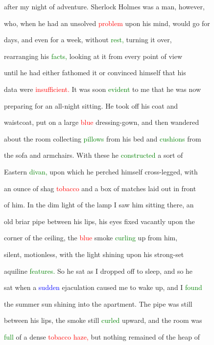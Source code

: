  after my night of \textcolor{BurntOrange}{adventure.} Sherlock Holmes was a man, however,

 who, when he had an unsolved \textcolor{red}{problem} upon his mind, would go for

 days, and even for a week, without \textcolor{green}{rest,} turning it over,

 rearranging his \textcolor{green}{facts,} looking at it from every point of view

 until he had either fathomed it or \textcolor{BurntOrange}{convinced} himself that his

 data were \textcolor{red}{insufficient.} It was soon \textcolor{green}{evident} to me that he was now

 \textcolor{BurntOrange}{preparing} for an all-night sitting. He took off his coat and

 waistcoat, put on a large \textcolor{red}{blue} dressing-gown, and then wandered

 about the room collecting \textcolor{green}{pillows} from his bed and \textcolor{green}{cushions} from

 the sofa and armchairs. With these he \textcolor{green}{constructed} a sort of

 Eastern \textcolor{green}{divan,} upon which he perched himself cross-legged, with

 an ounce of shag \textcolor{red}{tobacco} and a box of matches laid out in front

 of him. In the dim light of the lamp I saw him sitting there, an

 old briar pipe between his lips, his eyes fixed vacantly upon the

 corner of the ceiling, the \textcolor{red}{blue} smoke \textcolor{green}{curling} up from him,

 silent, motionless, with the light shining upon his strong-set

 aquiline \textcolor{green}{features.} So he sat as I dropped off to sleep, and so he

 sat when a \textcolor{blue}{sudden} \textcolor{BurntOrange}{ejaculation} caused me to wake up, and I \textcolor{green}{found}

 the summer \textcolor{BurntOrange}{sun} shining into the apartment. The pipe was still

 between his lips, the smoke still \textcolor{green}{curled} upward, and the room was

 \textcolor{green}{full} of a dense \textcolor{red}{tobacco} \textcolor{red}{haze,} but nothing remained of the heap of

